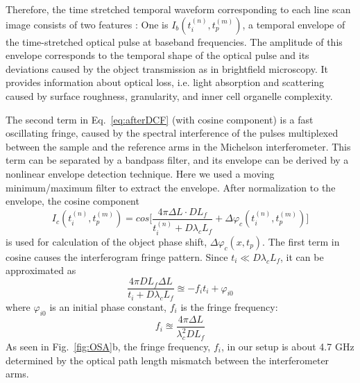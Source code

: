 \documentclass[aps,pra,reprint,longbibliography,superscriptaddress]{revtex4-1}
\begin{document}
Therefore, the time stretched temporal waveform corresponding to each line scan image consists of two features \cite{mahjoubfar2014label}: One is $I_b (t_i^{(n)}, t_p^{(m)})$, a temporal envelope of the time-stretched optical pulse at baseband frequencies. The amplitude of this envelope corresponds to the temporal shape of the optical pulse and its deviations caused by the object transmission as in brightfield microscopy. It provides information about optical loss, i.e. light absorption and scattering caused by surface roughness, granularity, and inner cell organelle complexity. 

The second term in Eq.~\ref{eq:afterDCF} (with cosine component) is a fast oscillating fringe, caused by the spectral interference of the pulses multiplexed between the sample and the reference arms in the Michelson interferometer. This term can be separated by a bandpass filter, and its envelope can be derived by a nonlinear envelope detection technique. Here we used a moving minimum/maximum filter to extract the envelope. After normalization to the envelope, the cosine component 
\begin{equation}
I_c (t_i^{(n)}, t_p^{(m)}) = cos\Bigg[ \frac{4\pi\Delta L \cdot D L_f}{t_i^{(n)} + D\lambda_c L_f} + \Delta \varphi_c(t_i^{(n)}, t_p^{(m)}) \Bigg]
\end{equation}
is used for calculation of the object phase shift, $\Delta\varphi_c(x,t_p)$. The first term in cosine causes the interferogram fringe pattern. Since $t_i \ll D \lambda_c L_f$, it can be approximated as
\begin{equation}
\frac{4\pi D L_f \Delta L}{t_i + D \lambda_c L_f} \approxeq - f_i t_i + \varphi_{i0}
\end{equation}
where $\varphi_{i0}$ is an initial phase constant, $f_i$ is the fringe frequency:
\begin{equation}
f_i \approxeq \frac{4\pi \Delta L}{\lambda_c^2 D L_f}
\end{equation}
As seen in Fig.~\ref{fig:OSA}b, the fringe frequency, $f_i$, in our setup is about 4.7 GHz determined by the optical path length mismatch between the interferometer arms.
\end{document}
